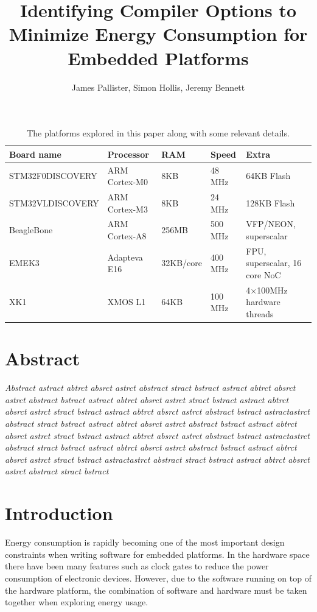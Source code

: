 \documentclass[twocolumn]{article}
\title{\bfseries\fontsize{22}{1}\selectfont Identifying Compiler Options to Minimize Energy Consumption for Embedded Platforms}
\author{James Pallister, Simon Hollis, Jeremy Bennett}
\newcommand{\nsection}[1]{\section{\bfseries #1}}
\let\oldcaption\caption
\renewcommand{\caption}[1]{\oldcaption{\textup{#1}}}
\begin{document}
\maketitle
\begin{table}[!hbt]
	\centering
	\begin{tabular}{l l l l l}
		\textbf{Board name} & \textbf{Processor} & \textbf{RAM} & \textbf{Speed} & \textbf{Extra} \\
		\hline
		STM32F0DISCOVERY	& ARM Cortex-M0 		& 8KB		& 48 MHz		  & 64KB Flash\\
		STM32VLDISCOVERY	& ARM Cortex-M3 		& 8KB		& 24 MHz		  & 128KB Flash\\
		BeagleBone			& ARM Cortex-A8 		& 256MB		& 500 MHz		  & VFP/NEON, superscalar\\
		EMEK3				& Adapteva E16 			& 32KB/core & 400 MHz		  & FPU, superscalar, 16 core NoC\\
		XK1					& XMOS L1 				& 64KB		& 100 MHz 		& 4$\times$100MHz hardware threads \\
	\end{tabular}
	\caption{The platforms explored in this paper along with some relevant details.}
	\label{Table:Platforms}
\end{table}

\nsection{Abstract}

\textit{
Abstract astract abtrct absrct astrct abstract stract bstract
astract abtrct absrct astrct abstract bstract
astract abtrct absrct astrct stract bstract
astract abtrct absrct astrct stract bstract
astract abtrct absrct astrct abstract bstract
astractastrct abstract stract bstract
astract abtrct absrct astrct abstract bstract
astract abtrct absrct astrct stract bstract
astract abtrct absrct astrct abstract bstract
astractastrct abstract stract bstract
astract abtrct absrct astrct abstract bstract
astract abtrct absrct astrct stract bstract
astractastrct abstract stract bstract
astract abtrct absrct astrct abstract stract bstract
}

\nsection{Introduction}


Energy consumption is rapidly becoming one of the most important design constraints when writing software for embedded platforms. In the hardware space there have been many features such as clock gates to reduce the power consumption of electronic devices. However, due to the software running on top of the hardware platform, the combination of software and hardware must be taken together when exploring energy usage.
\end{document}
